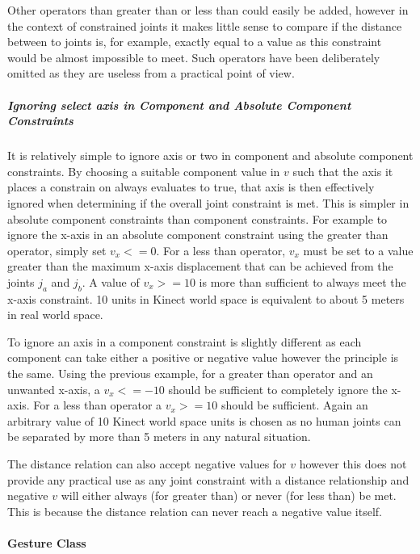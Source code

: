 \documentclass[a4paper,oneside]{memoir}
\begin{document}
						Other operators than greater than or less than could easily be added, however in the context of constrained joints it makes little sense to compare if the distance between to joints is, for example, exactly equal to a value as this constraint would be almost impossible to meet.
						Such operators have been deliberately omitted as they are useless from a practical point of view.

					\subparagraph{Ignoring select axis in Component and Absolute Component Constraints}

						It is relatively simple to ignore axis or two in component and absolute component constraints.
						By choosing a suitable component value in $v$ such that the axis it places a constrain on always evaluates to true, that axis is then effectively ignored when determining if the overall joint constraint is met.
						This is simpler in absolute component constraints than component constraints.
						For example to ignore the x-axis in an absolute component constraint using the greater than operator, simply set $v_x <= 0$.
						For a less than operator, $v_x$ must be set to a value greater than the maximum x-axis displacement that can be achieved from the joints $j_a$ and $j_b$.
						A value of $v_x >= 10$ is more than sufficient to always meet the x-axis constraint.
						10 units in Kinect world space is equivalent to about 5 meters in real world space.

						To ignore an axis in a component constraint is slightly different as each component can take either a positive or negative value however the principle is the same.
						Using the previous example, for a greater than operator and an unwanted x-axis, a $v_x <= -10$ should be sufficient to completely ignore the x-axis.
						For a less than operator a $v_x >= 10$ should be sufficient.
						Again an arbitrary value of 10 Kinect world space units is chosen as no human joints can be separated by more than 5 meters in any natural situation.

						The distance relation can also accept negative values for $v$ however this does not provide any practical use as any joint constraint with a distance relationship and negative $v$ will either always (for greater than) or never (for less than) be met.
						This is because the distance relation can never reach a negative value itself. 

				\paragraph{Gesture Class}
\end{document}
